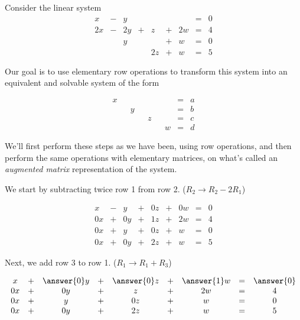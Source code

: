 \documentclass{ximera}
\begin{document}
\begin{exploration}
Consider the linear system
\begin{equation}
  \begin{array}{ccccccccc}
      x &- &y&&&&&= &0 \\
     2x& -&2y&+&z&+&2w&=&4\\
     & &y&&&+&w&=&0\\
     & &&&2z&+&w&=&5
  \end{array}
\end{equation}

Our goal is to use elementary row operations to transform this system into an equivalent and solvable system of the form

\begin{equation}\begin{array}{ccccccccc}
      x & &&&&&&= &a \\
     & &y&&&&&=&b\\
     & &&&z&&&=&c\\
     & &&&&&w&=&d
    \end{array}
    \end{equation}  
  
We'll first perform these steps as we have been, using row operations, and then perform the same operations with elementary matrices, on what's called an \emph{augmented matrix} representation of the system.

We start by subtracting twice row 1 from row 2. ($R_2\rightarrow R_2-2R_1$)
 
$$\begin{matrix}
      x &- &y&+&0z&+&0w&= &0 \\
     0x& +&0y&+& 1z&+& 2w&=& 4\\
     0x& +&y&+&0z&+&w&=&0\\
     0x&+&0y&+&2z&+&w&=&5
    \end{matrix}$$

Next, we add row 3 to row 1. ($R_1\rightarrow R_1+R_3$) 

\begin{prompt}
 $$\begin{matrix}
      x &+ & \answer{0}y&+&\answer{0}z&+& \answer{1}w&= & \answer{0} \\
     0x& +&0y&+&z&+&2w&=&4\\
     0x& +&y&+&0z&+&w&=&0\\
     0x&+&0y&+&2z&+&w&=&5
    \end{matrix}$$
\end{prompt}



\end{exploration}
\end{document}
